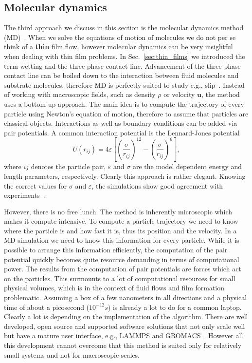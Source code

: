 \subsection{Molecular dynamics}
The third approach we discuss in this section is the molecular dynamics method (MD)~\cite{haileMolecularDynamicsSimulation1997, zhangMolecularSimulationThin2019, wengMolecularDynamicsInvestigation2000}.
When we solve the equations of motion of molecules we do not per se think of a \textbf{thin} film flow, however molecular dynamics can be very insightful when dealing with thin film problems. 
In Sec.~\ref{sec:thin_films} we introduced the term wetting and the three phase contact line.
Advancement of the three phase contact line can be boiled down to the interaction between fluid molecules and substrate molecules, therefore MD is perfectly suited to study e.g., slip~\cite{jabbarzadehWallSlipMolecular1999, segaRegularizationSlipLength2013}. 
Instead of working with macroscopic fields, such as density $\rho$ or velocity $\mathbf{u}$, the method uses a bottom up approach.
The main idea is to compute the trajectory of every particle using Newton's equation of motion, therefore to assume that particles are classical objects.
Interactions as well as boundary conditions can be added via pair potentials.
A common interaction potential is the Lennard-Jones potential
\begin{equation}\label{eq:Len-Jon}
    U(r_{ij}) = 4\varepsilon\left[\left(\frac{\sigma}{r_{ij}}\right)^{12}-\left(\frac{\sigma}{r_{ij}}\right)^6\right],
\end{equation}
where $ij$ denotes the particle pair, $\varepsilon$ and $\sigma$ are the model dependent energy and length parameters, respectively.
Clearly this approach is rather elegant.
Knowing the correct values for $\sigma$ and $\varepsilon$, the simulations show good agreement with experiments~\cite{zhangMolecularSimulationThin2019}.

However, there is no free lunch. 
The method is inherently microscopic which makes it compute intensive.
To compute a particle trajectory we need to know where the particle is and how fast it is, thus its position and the velocity.
In a MD simulation we need to know this information for every particle.
While it is possible to arrange this information efficiently, the computation of the pair potential quickly becomes quite resource demanding in terms of computational power.
The results from the computation of pair potentials are forces which act on the particles.
This surmounts to a lot of computational resources for small physical volumes, which is in the context of fluid flows and film formation problematic.
Assuming a box of a few nanometers in all directions and a physical time of about a picosecond ($10^{-12}s$) is already a lot to do for a common laptop.
Clearly a lot is depending on the implementation of the algorithm. 
There are well developed, open source and supported software solutions that not only scale well but have a mature user interface, e.g., LAMMPS and GROMACS~\cite{plimptonFastParallelAlgorithms1995, berendsenGROMACSMessagepassingParallel1995, lindahlGROMACSPackageMolecular2001}.  
However all this development cannot overcome that this method is suited only for relatively small systems and not for macroscopic scales.


